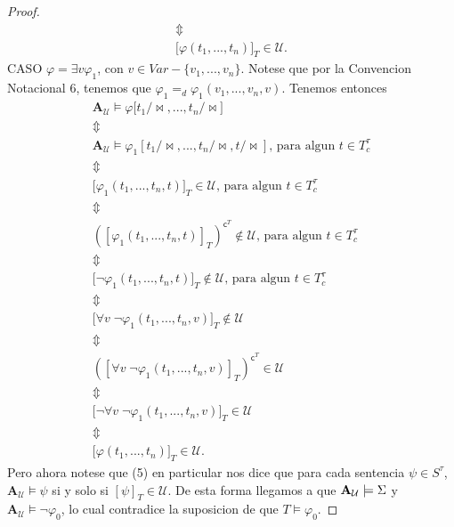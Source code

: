 \begin{proof}
\begin{equation*}
\begin{array}{c}
\Updownarrow \\ 
\lbrack \varphi (t_{1},...,t_{n})]_{T}\in \mathcal{U}.%
\end{array}%
\end{equation*}%
CASO $\varphi =\exists v\varphi _{1}$, con $v\in Var-\{v_{1},...,v_{n}\}$.
Notese que por la Convencion Notacional 6, tenemos que $\varphi
_{1}=_{d}\varphi _{1}(v_{1},...,v_{n},v)$. Tenemos entonces%
\begin{equation*}
\begin{array}{c}
\mathbf{A}_{\mathcal{U}}\models \varphi \lbrack t_{1}/\mathrm{\bowtie }%
,...,t_{n}/\mathrm{\bowtie }] \\ 
\Updownarrow \\ 
\mathbf{A}_{\mathcal{U}}\models \varphi _{1}[t_{1}/\mathrm{\bowtie }%
,...,t_{n}/\mathrm{\bowtie },t/\mathrm{\bowtie }]\text{, para algun }t\in
T_{c}^{\tau } \\ 
\Updownarrow \\ 
\lbrack \varphi _{1}(t_{1},...,t_{n},t)]_{T}\in \mathcal{U}\text{, para
algun }t\in T_{c}^{\tau } \\ 
\Updownarrow \\ 
([\varphi _{1}(t_{1},...,t_{n},t)]_{T})^{\mathsf{c}^{T}}\not\in \mathcal{U}%
\text{, para algun }t\in T_{c}^{\tau } \\ 
\Updownarrow \\ 
\lbrack \neg \varphi _{1}(t_{1},...,t_{n},t)]_{T}\not\in \mathcal{U}\text{,
para algun }t\in T_{c}^{\tau } \\ 
\Updownarrow \\ 
\lbrack \forall v\;\neg \varphi _{1}(t_{1},...,t_{n},v)]_{T}\not\in 
\mathcal{U} \\ 
\Updownarrow \\ 
([\forall v\;\neg \varphi _{1}(t_{1},...,t_{n},v)]_{T})^{\mathsf{c}^{T}}\in 
\mathcal{U} \\ 
\Updownarrow \\ 
\lbrack \neg \forall v\;\neg \varphi _{1}(t_{1},...,t_{n},v)]_{T}\in 
\mathcal{U} \\ 
\Updownarrow \\ 
\lbrack \varphi (t_{1},...,t_{n})]_{T}\in \mathcal{U}.%
\end{array}%
\end{equation*}%
Pero ahora notese que (5) en particular nos dice que para cada sentencia $%
\psi \in S^{\tau }$, $\mathbf{A}_{\mathcal{U}}\models \psi $ si y solo si $%
[\psi ]_{T}\in \mathcal{U}.$ De esta forma llegamos a que $\mathbf{A}_{%
\mathcal{U}}\models \Sigma $ y $\mathbf{A}_{\mathcal{U}}\models \neg
\varphi_0$, lo cual contradice la suposicion de que $T\models \varphi
_0.$


\end{proof}
